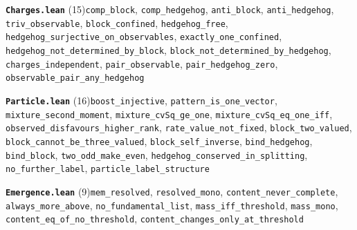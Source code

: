 \documentclass[11pt,a4paper]{article}
\theoremstyle{sudef}
\begin{document}
\noindent\textbf{\texttt{Charges.lean}} (15)\quad \texttt{comp\_\allowbreak block}, \texttt{comp\_\allowbreak hedgehog}, \texttt{anti\_\allowbreak block}, \texttt{anti\_\allowbreak hedgehog}, \texttt{triv\_\allowbreak observable}, \texttt{block\_\allowbreak confined}, \texttt{hedgehog\_\allowbreak free}, \texttt{hedgehog\_\allowbreak surjective\_\allowbreak on\_\allowbreak observables}, \texttt{exactly\_\allowbreak one\_\allowbreak confined}, \texttt{hedgehog\_\allowbreak not\_\allowbreak determined\_\allowbreak by\_\allowbreak block}, \texttt{block\_\allowbreak not\_\allowbreak determined\_\allowbreak by\_\allowbreak hedgehog}, \texttt{charges\_\allowbreak independent}, \texttt{pair\_\allowbreak observable}, \texttt{pair\_\allowbreak hedgehog\_\allowbreak zero}, \texttt{observable\_\allowbreak pair\_\allowbreak any\_\allowbreak hedgehog}\par\smallskip
\noindent\textbf{\texttt{Particle.lean}} (16)\quad \texttt{boost\_\allowbreak injective}, \texttt{pattern\_\allowbreak is\_\allowbreak one\_\allowbreak vector}, \texttt{mixture\_\allowbreak second\_\allowbreak moment}, \texttt{mixture\_\allowbreak cvSq\_\allowbreak ge\_\allowbreak one}, \texttt{mixture\_\allowbreak cvSq\_\allowbreak eq\_\allowbreak one\_\allowbreak iff}, \texttt{observed\_\allowbreak disfavours\_\allowbreak higher\_\allowbreak rank}, \texttt{rate\_\allowbreak value\_\allowbreak not\_\allowbreak fixed}, \texttt{block\_\allowbreak two\_\allowbreak valued}, \texttt{block\_\allowbreak cannot\_\allowbreak be\_\allowbreak three\_\allowbreak valued}, \texttt{block\_\allowbreak self\_\allowbreak inverse}, \texttt{bind\_\allowbreak hedgehog}, \texttt{bind\_\allowbreak block}, \texttt{two\_\allowbreak odd\_\allowbreak make\_\allowbreak even}, \texttt{hedgehog\_\allowbreak conserved\_\allowbreak in\_\allowbreak splitting}, \texttt{no\_\allowbreak further\_\allowbreak label}, \texttt{particle\_\allowbreak label\_\allowbreak structure}\par\smallskip
\noindent\textbf{\texttt{Emergence.lean}} (9)\quad \texttt{mem\_\allowbreak resolved}, \texttt{resolved\_\allowbreak mono}, \texttt{content\_\allowbreak never\_\allowbreak complete}, \texttt{always\_\allowbreak more\_\allowbreak above}, \texttt{no\_\allowbreak fundamental\_\allowbreak list}, \texttt{mass\_\allowbreak iff\_\allowbreak threshold}, \texttt{mass\_\allowbreak mono}, \texttt{content\_\allowbreak eq\_\allowbreak of\_\allowbreak no\_\allowbreak threshold}, \texttt{content\_\allowbreak changes\_\allowbreak only\_\allowbreak at\_\allowbreak threshold}\par\smallskip
\end{document}
